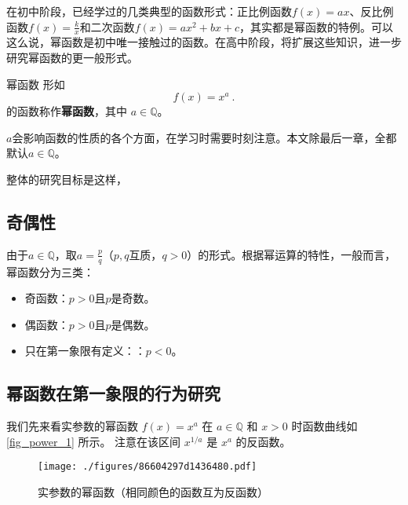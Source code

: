 
\begin{issues}
\issueDraft
\end{issues}


在初中阶段，已经学过的几类典型的函数形式：正比例函数$f(x) = ax$、反比例函数$f(x) = \frac{k}{x}$和二次函数$f(x) = ax^2+bx+c$，其实都是幂函数的特例。可以这么说，幂函数是初中唯一接触过的函数。在高中阶段，将扩展这些知识，进一步研究幂函数的更一般形式。

\begin{definition}{幂函数}
形如
\begin{equation}
f(x) = x^a~.
\end{equation}
的函数称作\textbf{幂函数}，其中 $a\in\mathbb Q$。
\end{definition}
$a$会影响函数的性质的各个方面，在学习时需要时刻注意。本文除最后一章，全都默认$a\in\mathbb Q$。


整体的研究目标是这样，

\subsection{奇偶性}

由于$a\in\mathbb Q$，取$\displaystyle a=\frac{p}{q}$（$p,q$互质，$q>0$）的形式。根据幂运算的特性，一般而言，幂函数分为三类：
\begin{itemize}
\item 奇函数：$p>0$且$p$是奇数。
\item 偶函数：$p>0$且$p$是偶数。
\item 只在第一象限有定义：：$p<0$。
\end{itemize}

\subsection{幂函数在第一象限的行为研究}


我们先来看实参数的幂函数 $f(x) = x^a$ 在 $a\in\mathbb Q$ 和 $x > 0$ 时函数曲线如\autoref{fig_power_1} 所示。 注意在该区间 $x^{1/a}$ 是 $x^a$ 的反函数。

\begin{figure}[ht]
\centering
\texttt{[image: ./figures/86604297d1436480.pdf]}
\caption{实参数的幂函数（相同颜色的函数互为反函数）}\label{fig_power_1}
\end{figure}

